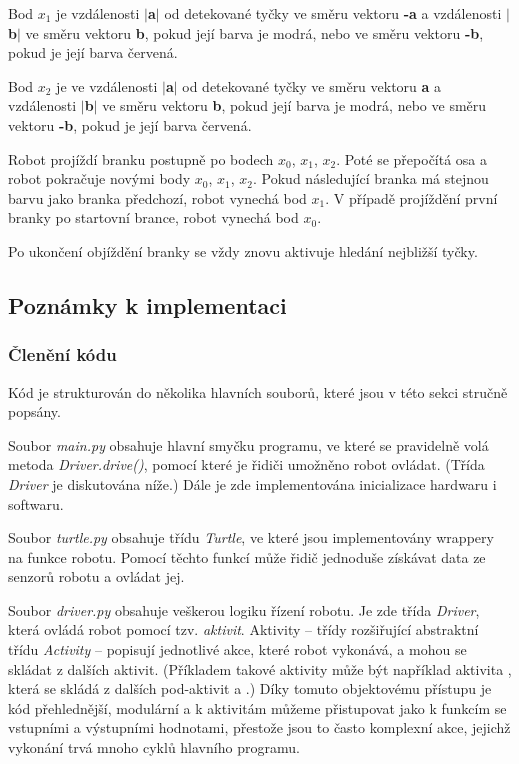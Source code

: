 \documentclass{article}
\begin{document}
	Bod $x_{1}$ je vzdálenosti  $\vert$\textbf{a}$\vert$ od detekované tyčky ve směru vektoru \textbf{-a} a vzdálenosti  $\vert$\textbf{b}$\vert$ ve směru vektoru \textbf{b}, pokud její barva je modrá, nebo ve směru vektoru \textbf{-b}, pokud je její barva červená. 

	Bod $x_{2}$ je ve vzdálenosti $\vert$\textbf{a}$\vert$ od detekované tyčky ve směru vektoru \textbf{a} a vzdálenosti $\vert$\textbf{b}$\vert$ ve směru vektoru \textbf{b}, pokud její barva je modrá, nebo ve směru vektoru \textbf{-b}, pokud je její barva červená. 

	Robot projíždí branku postupně po bodech $x_{0}$, $x_{1}$, $x_{2}$. Poté se přepočítá osa a robot pokračuje novými body $x_{0}$, $x_{1}$, $x_{2}$. Pokud následující branka má stejnou barvu jako branka předchozí, robot vynechá bod $x_{1}$. V případě projíždění první branky po startovní brance, robot vynechá bod $x_{0}$.
	
	Po ukončení objíždění branky se vždy znovu aktivuje hledání nejbližší tyčky. 
	
\subsection{Poznámky k implementaci}

\subsubsection{Členění kódu}

	Kód je strukturován do několika hlavních souborů, které jsou v této sekci stručně popsány.
	
	Soubor \emph{main.py} obsahuje hlavní smyčku programu, ve které se pravidelně volá metoda \emph{Driver.drive()}, pomocí které je řidiči umožněno robot ovládat. (Třída \emph{Driver} je diskutována níže.) Dále je zde implementována inicializace hardwaru i softwaru.
	
	Soubor \emph{turtle.py} obsahuje třídu \emph{Turtle}, ve které jsou implementovány wrappery na funkce robotu. Pomocí těchto funkcí může řidič jednoduše získávat data ze senzorů robotu a ovládat jej.
	
	Soubor \emph{driver.py} obsahuje veškerou logiku řízení robotu. Je zde třída \emph{Driver}, která ovládá robot pomocí tzv. \emph{aktivit}. Aktivity -- třídy rozšiřující abstraktní třídu \emph{Activity} -- popisují jednotlivé akce, které robot vykonává, a mohou se skládat z dalších aktivit. (Příkladem takové aktivity může být například aktivita , která se skládá z dalších pod-aktivit  a .) Díky tomuto objektovému přístupu je kód přehlednější, modulární a k aktivitám můžeme přistupovat jako k funkcím se vstupními a výstupními hodnotami, přestože jsou to často komplexní akce, jejichž vykonání trvá mnoho cyklů hlavního programu.
	
\end{document}

